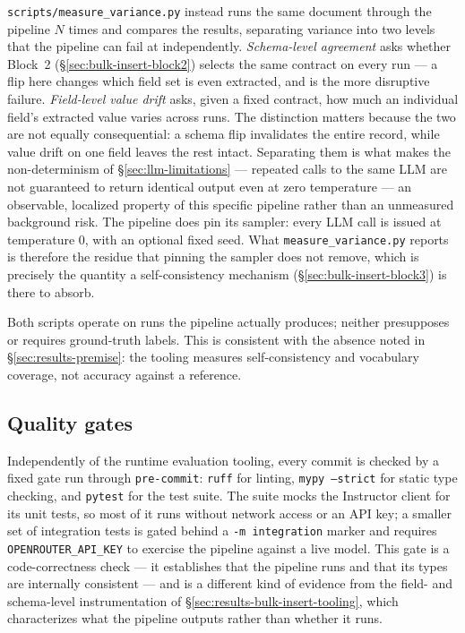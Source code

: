 \texttt{scripts/measure\_variance.py} instead runs the same document through the pipeline $N$ times and compares the results, separating variance into two levels that the pipeline can fail at independently. \emph{Schema-level agreement} asks whether Block~2 (\S\ref{sec:bulk-insert-block2}) selects the same contract on every run — a flip here changes which field set is even extracted, and is the more disruptive failure. \emph{Field-level value drift} asks, given a fixed contract, how much an individual field's extracted value varies across runs. The distinction matters because the two are not equally consequential: a schema flip invalidates the entire record, while value drift on one field leaves the rest intact. Separating them is what makes the non-determinism of \S\ref{sec:llm-limitations} — repeated calls to the same LLM are not guaranteed to return identical output even at zero temperature \citep{he2025defeating} — an observable, localized property of this specific pipeline rather than an unmeasured background risk. The pipeline does pin its sampler: every LLM call is issued at temperature 0, with an optional fixed seed. What \texttt{measure\_variance.py} reports is therefore the residue that pinning the sampler does not remove, which is precisely the quantity a self-consistency mechanism (\S\ref{sec:bulk-insert-block3}) is there to absorb.

Both scripts operate on runs the pipeline actually produces; neither presupposes or requires ground-truth labels. This is consistent with the absence noted in \S\ref{sec:results-premise}: the tooling measures self-consistency and vocabulary coverage, not accuracy against a reference.

\subsection{Quality gates}
\label{sec:results-bulk-insert-quality-gates}

Independently of the runtime evaluation tooling, every commit is checked by a fixed gate run through \texttt{pre-commit}: \texttt{ruff} for linting, \texttt{mypy --strict} for static type checking, and \texttt{pytest} for the test suite. The suite mocks the Instructor client for its unit tests, so most of it runs without network access or an API key; a smaller set of integration tests is gated behind a \texttt{-m integration} marker and requires \texttt{OPENROUTER\_API\_KEY} to exercise the pipeline against a live model. This gate is a code-correctness check — it establishes that the pipeline runs and that its types are internally consistent — and is a different kind of evidence from the field- and schema-level instrumentation of \S\ref{sec:results-bulk-insert-tooling}, which characterizes what the pipeline outputs rather than whether it runs.

